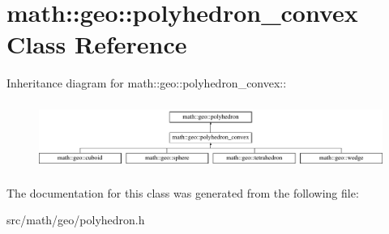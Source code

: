 \hypertarget{classmath_1_1geo_1_1polyhedron__convex}{
\section{math::geo::polyhedron\_\-convex Class Reference}
\label{classmath_1_1geo_1_1polyhedron__convex}
}
Inheritance diagram for math::geo::polyhedron\_\-convex::\begin{figure}[H]
\begin{center}
\leavevmode
\includegraphics[height=2.19895cm]{classmath_1_1geo_1_1polyhedron__convex}
\end{center}
\end{figure}


The documentation for this class was generated from the following file:\begin{DoxyCompactItemize}
\item 
src/math/geo/polyhedron.h\end{DoxyCompactItemize}
